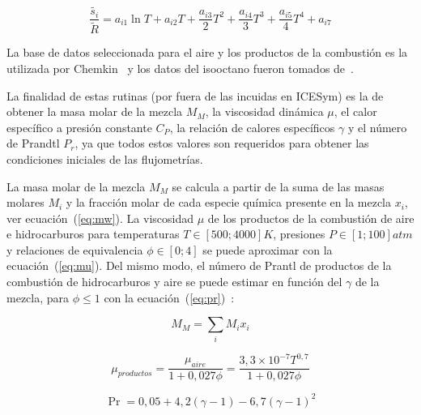 \begin{equation}\label{eq:s} \frac{\widetilde{s_{i}}}{\widetilde{R}} = a_{i1} \ln{T} + a_{i2}T + \frac{a_{i3}}{2}T^{2} + \frac{a_{i4}}{3}T^{3} + \frac{a_{i5}}{4}T^{4} + a_{i7}
\end{equation}


La base de datos seleccionada para el aire y los productos de la combustión es
la utilizada por Chemkin~\parencite{chemkin} y los datos del isooctano fueron
tomados de~\parencite{raine}.

La finalidad de estas rutinas (por fuera de las incuidas en ICESym) es la de
obtener la masa molar de la mezcla $M_{M}$, la viscosidad dinámica $\mu$, el
calor específico a presión constante $C_{P}$, la relación de calores
específicos $\gamma$ y el número de Prandtl $P_{r}$, ya que todos estos valores
son requeridos para obtener las condiciones iniciales de las flujometrías.

La masa molar de la mezcla $M_{M}$ se calcula a partir de la suma de las masas
molares $M_{i}$ y la fracción molar de cada especie química presente en la
mezcla $x_{i}$, ver ecuación~(\ref{eq:mw}).
%
La viscosidad $\mu$ de los productos de la combustión de aire e hidrocarburos
para temperaturas $T\in [500; 4000]K$, presiones $P\in[1; 100]atm$ y relaciones
de equivalencia $\phi \in [0;4]$ se puede aproximar con la
ecuación~(\ref{eq:mu}).
%
Del mismo modo, el número de Prantl de productos de la combustión de
hidrocarburos y aire se puede estimar en función del $\gamma$ de la mezcla,
para $\phi\leq 1$ con la ecuación~(\ref{eq:pr})~\parencite{heywood}:


\begin{equation}\label{eq:mw}
  M_{M} = \sum_{i} M_{i}x_{i}
\end{equation}

\begin{equation}\label{eq:mu}
  \mu_{productos} = \frac{\mu_{aire}} {1 + 0,027 \phi} = \frac{3,3\times 10^{-7} T^{0,7}} {1 + 0,027 \phi}
\end{equation}

\begin{equation}\label{eq:pr}
    \Pr = 0,05 + 4,2 (\gamma - 1) - 6,7 {(\gamma - 1)}^{2}
\end{equation}

